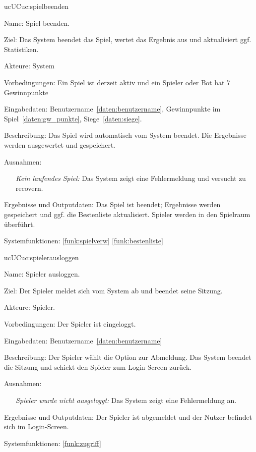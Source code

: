 \begin{description}[leftmargin=5em, style=sameline]
    \begin{lhp}{uc}{UC}{uc:spielbeenden}
    \item [Name:] Spiel beenden.
    \item [Ziel:] Das System beendet das Spiel, wertet das Ergebnis aus und aktualisiert ggf. Statistiken.
    \item [Akteure:] System
    \item [Vorbedingungen:] Ein Spiel ist derzeit aktiv und ein Spieler oder Bot hat 7 Gewinnpunkte
    \item [Eingabedaten:] Benutzername~\ref{daten:benutzername}, Gewinnpunkte im Spiel~\ref{daten:gw_punkte}, Siege~\ref{daten:siege}.
    \item [Beschreibung:] Das Spiel wird automatisch vom System beendet. Die Ergebnisse werden ausgewertet und gespeichert.
    \item [Ausnahmen:] \hfill
        \begin{itemize}
            \item[] \textit{Kein laufendes Spiel:} Das System zeigt eine Fehlermeldung und versucht zu recovern.
        \end{itemize}
    \item [Ergebnisse und Outputdaten:] Das Spiel ist beendet; Ergebnisse werden gespeichert und ggf. die Bestenliste aktualisiert. Spieler werden in den Spielraum überführt.
    \item [Systemfunktionen:] \ref{funk:spielverw} \ref{funk:bestenliste}
    \end{lhp}

    \begin{lhp}{uc}{UC}{uc:spielerausloggen}
    \item [Name:] Spieler ausloggen.
    \item [Ziel:] Der Spieler meldet sich vom System ab und beendet seine Sitzung.
    \item [Akteure:] Spieler.
    \item [Vorbedingungen:] Der Spieler ist eingeloggt.
    \item [Eingabedaten:] Benutzername~\ref{daten:benutzername}
    \item [Beschreibung:] Der Spieler wählt die Option zur Abmeldung. Das System beendet die Sitzung und schickt den Spieler zum Login-Screen zurück.
    \item [Ausnahmen:] \hfill
        \begin{itemize}
            \item[] \textit{Spieler wurde nicht ausgeloggt:} Das System zeigt eine Fehlermeldung an.
        \end{itemize}
    \item [Ergebnisse und Outputdaten:] Der Spieler ist abgemeldet und der Nutzer befindet sich im Login-Screen.
    \item [Systemfunktionen:] \ref{funk:zugriff}
    \end{lhp}


\end{description}
